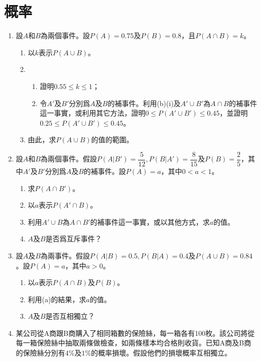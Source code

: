 \documentclass[12pt]{article}
\begin{document}
    \section{概率}
    \begin{enumerate}
        \item 設$A$和$B$為兩個事件。設$P(A)=0.75$及$P(B)=0.8$，且$P(A\cap B)=k$。\begin{enumerate}
            \item 以$k$表示$P(A\cup B)$。
            \item \begin{enumerate}
                \item 證明$0.55\leq k\leq 1$；
                \item 令$A'$及$B'$分別爲$A$及$B$的補事件。利用(b)(i)及$A'\cup B'$為$A\cap B$的補事件這一事實，或利用其它方法，證明$0\leq P(A'\cup B')\leq 0.45$，並證明$0.25\leq P(A'\cup B')\leq 0.45$。
            \end{enumerate}
            \item 由此，求$P(A\cup B)$的值的範圍。
        \end{enumerate}
        \item 設$A$和$B$為兩個事件。假設$P(A|B')=\dfrac{5}{12},P(B|A')=\dfrac{8}{15}$及$P(B)=\dfrac{2}{5}$，其中$A'$及$B'$分別爲$A$及$B$的補事件。設$P(A)=a$，其中$0< a< 1$。\begin{enumerate}
            \item 求$P(A\cap B')$。
            \item 以$a$表示$P(A'\cap B)$。
            \item 利用$A'\cup B$為$A\cap B'$的補事件這一事實，或以其他方式，求$a$的值。
            \item $A$及$B$是否爲互斥事件？
        \end{enumerate}
        \item 設$A$及$B$為兩事件。假設$P(A|B)=0.5,P(B|A)=0.4$及$P(A\cup B)=0.84$。設$P(A)=a$，其中$a>0$。\begin{enumerate}
            \item 以$a$表示$P(A\cap B)$及$P(B)$。
            \item 利用(a)的結果，求$a$的值。
            \item $A$及$B$是否互相獨立？
        \end{enumerate}
        \item 某公司從A商跟B商購入了相同箱數的保險絲，每一箱各有100枚。該公司將從每一箱保險絲中抽取兩條做檢查，如兩條樣本均合格則收貨。已知A商及B商的保險絲分別有$4\%$及$1\%$的概率損壞。假設他們的損壞概率互相獨立。\begin{enumerate}

\end{enumerate}
\end{enumerate}
\end{document}
